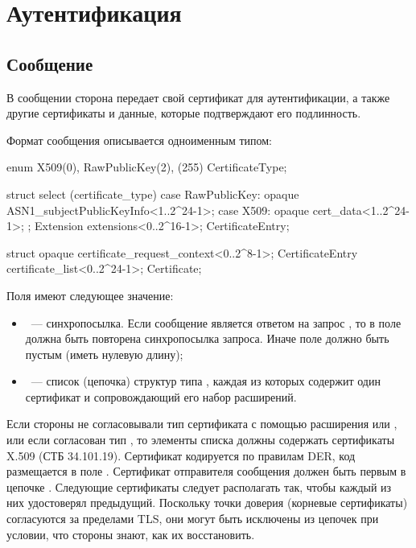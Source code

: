 \section{Аутентификация}\label{HS.Auth} 

\subsection{Сообщение }\label{HS.CT} 

В сообщении  сторона передает свой сертификат для
аутентификации, а также другие сертификаты и данные, которые подтверждают его
подлинность.

Формат сообщения  описывается одноименным типом:
%
\begin{codeblock}
enum {
  X509(0),
  RawPublicKey(2),
  (255)
} CertificateType;

struct {
  select (certificate_type) {
    case RawPublicKey:
      opaque ASN1_subjectPublicKeyInfo<1..2^24-1>;
    case X509:
      opaque cert_data<1..2^24-1>;
  };
  Extension extensions<0..2^16-1>;
} CertificateEntry;

struct {
  opaque certificate_request_context<0..2^8-1>;
  CertificateEntry certificate_list<0..2^24-1>;
} Certificate;
\end{codeblock}

Поля  имеют следующее значение:
%
\begin{itemize}
\item
{}~--- синхропосылка. Если сообщение является
ответом на запрос , то в поле должна быть 
повторена синхропосылка запроса. Иначе поле должно быть пустым (иметь нулевую 
длину); 

\item
{}~--- список (цепочка) структур типа
, каждая из которых содержит один сертификат 
и сопровождающий его набор расширений.
\end{itemize}

Если стороны не согласовывали тип сертификата 
с помощью расширения 
или , или если согласован тип 
, то элементы списка  должны 
содержать сертификаты X.509 (СТБ 34.101.19). Сертификат кодируется по правилам 
DER, код размещается в поле . 
%
Сертификат отправителя сообщения  должен быть 
первым в цепочке . Следующие сертификаты следует 
располагать так, чтобы каждый из них удостоверял предыдущий.
%
Поскольку точки доверия (корневые сертификаты) согласуются за пределами TLS, 
они могут быть исключены из цепочек при условии, что стороны знают, как их 
восстановить.

